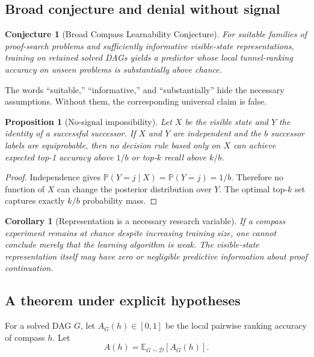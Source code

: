 \documentclass[11pt]{article}
\newtheorem{corollary}[theorem]{Corollary}
\newtheorem{proposition}[theorem]{Proposition}
\newtheorem{conjecture}[theorem]{Conjecture}
\newcommand{\Prob}{\mathbb{P}}
\newcommand{\E}{\mathbb{E}}
\newcommand{\Dcal}{\mathcal{D}}
\begin{document}
\subsection{Broad conjecture and denial without signal}

\begin{conjecture}[Broad Compass Learnability Conjecture]
For suitable families of proof-search problems and sufficiently informative visible-state representations, training on retained solved DAGs yields a predictor whose local tunnel-ranking accuracy on unseen problems is substantially above chance.
\end{conjecture}

The words ``suitable,'' ``informative,'' and ``substantially'' hide the necessary assumptions. Without them, the corresponding universal claim is false.

\begin{proposition}[No-signal impossibility]
Let \(X\) be the visible state and \(Y\) the identity of a successful successor. If \(X\) and \(Y\) are independent and the \(b\) successor labels are equiprobable, then no decision rule based only on \(X\) can achieve expected top-1 accuracy above \(1/b\) or top-\(k\) recall above \(k/b\).
\end{proposition}

\begin{proof}
Independence gives \(\Prob(Y=j\mid X)=\Prob(Y=j)=1/b\). Therefore no function of \(X\) can change the posterior distribution over \(Y\). The optimal top-\(k\) set captures exactly \(k/b\) probability mass.
\end{proof}

\begin{corollary}[Representation is a necessary research variable]
If a compass experiment remains at chance despite increasing training size, one cannot conclude merely that the learning algorithm is weak. The visible-state representation itself may have zero or negligible predictive information about proof continuation.
\end{corollary}

\subsection{A theorem under explicit hypotheses}

For a solved DAG \(G\), let \(A_G(h)\in[0,1]\) be the local pairwise ranking accuracy of compass \(h\). Let
\[
A(h)=\E_{G\sim\Dcal}[A_G(h)].
\]
\end{document}
